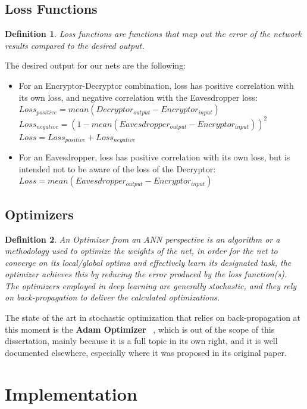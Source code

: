 \documentclass[a4paper, 12pt]{report}
\newcommand\tab[1][1cm]{\hspace*{#1}}
\newtheorem{definition}{Definition}
\begin{document}
\section{\textbf{Loss Functions}}
\begin{definition}
	Loss functions are functions that map out the error of the network results compared to the desired output.
\end{definition}
The desired output for our nets are the following:
\begin{itemize}[nosep]
	\item For an Encryptor-Decryptor combination, loss has positive correlation with its own loss, and negative correlation with the Eavesdropper loss:\\
	\tab $ Loss_{positive} = mean(Decryptor_{output} - Encryptor_{input}) $\\
	\tab $ Loss_{negative} = (1 - mean(Eavesdropper_{output} - Encryptor_{input}))^{2} $\\
	\tab $ Loss = Loss_{positive} + Loss_{negative} $
	\item For an Eavesdropper, loss has positive correlation with its own loss, but is intended not to be aware of the loss of the Decryptor:\\
	\tab $ Loss = mean(Eavesdropper_{output} - Encryptor_{input}) $
\end{itemize}
\section{\textbf{Optimizers}}
\begin{definition}
	An Optimizer from an ANN perspective is an algorithm or a methodology used to optimize the weights of the net, in order for the net to converge on its local/global optima and effectively learn its designated task, the optimizer achieves this by reducing the error produced by the loss function(s).\\
	The optimizers employed in deep learning are generally stochastic, and they rely on back-propagation to deliver the calculated optimizations. 
\end{definition}
The state of the art in stochastic optimization that relies on back-propagation at this moment is the \textbf{Adam Optimizer} ~\citep{DBLP:journals/corr/KingmaB14}, which is out of the scope of this dissertation, mainly because it is a full topic in its own right, and it is well documented elsewhere, especially where it was proposed in its original paper.
\newpage
\chapter{Implementation}\label{sec:implementation}
\end{document}
